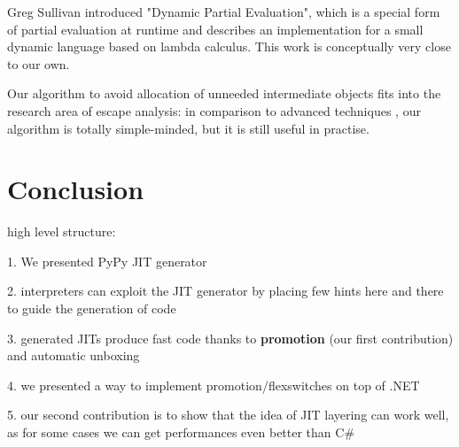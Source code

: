 Greg Sullivan introduced "Dynamic Partial Evaluation", which is a special
form of partial evaluation at runtime \cite{sullivan_dynamic_2001} and describes
an implementation for a small dynamic language based on lambda calculus. This
work is conceptually very close to our own.

Our algorithm to avoid allocation of unneeded intermediate objects fits into
the research area of escape analysis: in comparison to advanced techniques
\cite{Blanchet99escapeanalysis}, \cite{Choi99escapeanalysis} our algorithm is
totally simple-minded, but it is still useful in practise.


\section{Conclusion}

high level structure:

1. We presented PyPy JIT generator 

2. interpreters can exploit the JIT generator by placing few hints here and
there to guide the generation of code

3. generated JITs produce fast code thanks to \textbf{promotion} (our first
contribution) and automatic unboxing

4. we presented a way to implement promotion/flexswitches on top of .NET

5. our second contribution is to show that the idea of JIT layering can work
well, as for some cases we can get performances even better than C\#
